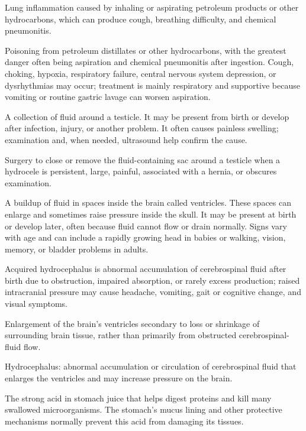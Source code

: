  Lung inflammation caused by inhaling or aspirating petroleum products or other hydrocarbons, which can produce cough, breathing difficulty, and chemical pneumonitis.

 Poisoning from petroleum distillates or other hydrocarbons, with the greatest danger often being aspiration and chemical pneumonitis after ingestion. Cough, choking, hypoxia, respiratory failure, central nervous system depression, or dysrhythmias may occur; treatment is mainly respiratory and supportive because vomiting or routine gastric lavage can worsen aspiration.

 A collection of fluid around a testicle. It may be present from birth or develop after infection, injury, or another problem. It often causes painless swelling; examination and, when needed, ultrasound help confirm the cause.

 Surgery to close or remove the fluid-containing sac around a testicle when a hydrocele is persistent, large, painful, associated with a hernia, or obscures examination.

 A buildup of fluid in spaces inside the brain called
ventricles. These spaces can enlarge and sometimes raise pressure inside the
skull. It may be present at birth or develop later, often because fluid cannot
flow or drain normally. Signs vary with age and can include a rapidly growing
head in babies or walking, vision, memory, or bladder problems in adults.

 Acquired hydrocephalus is abnormal accumulation of cerebrospinal fluid after birth due to obstruction, impaired absorption, or rarely excess production; raised intracranial pressure may cause headache, vomiting, gait or cognitive change, and visual symptoms.

 Enlargement of the brain's ventricles secondary to loss or shrinkage of surrounding brain tissue, rather than primarily from obstructed cerebrospinal-fluid flow.

 Hydrocephalus: abnormal accumulation or circulation of cerebrospinal fluid that enlarges the ventricles and may increase pressure on the brain.

 The strong acid in stomach juice that helps digest proteins and kill many swallowed microorganisms. The stomach’s mucus lining and other protective mechanisms normally prevent this acid from damaging its tissues.

